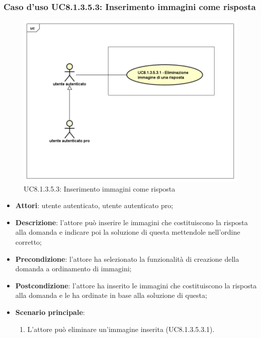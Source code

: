 \subsubsection{Caso d'uso UC8.1.3.5.3: Inserimento immagini come risposta}
\label{UC8.1.3.5.3}
\begin{figure}[h]
	\centering
	\includegraphics[scale=0.45,keepaspectratio]{UML/UC8_1_3_5_3.png}
	\caption{UC8.1.3.5.3: Inserimento immagini come risposta}
\end{figure}
\begin{itemize}
	\item\textbf{Attori}: utente autenticato, utente autenticato pro;
	\item\textbf{Descrizione}: l'attore può inserire le immagini che costituiscono la risposta alla domanda e indicare poi la soluzione di questa mettendole nell'ordine corretto;
	\item\textbf{Precondizione}: l'attore ha selezionato la funzionalità di creazione della domanda a ordinamento di immagini; 
	\item \textbf{Postcondizione}: l'attore ha inserito le immagini che costituiscono la risposta alla domanda e le ha ordinate in base alla soluzione di questa;
	\item\textbf{Scenario principale}:
		\begin{enumerate}
			\item L'attore può eliminare un'immagine inserita (UC8.1.3.5.3.1).
		\end{enumerate}
\end{itemize}
